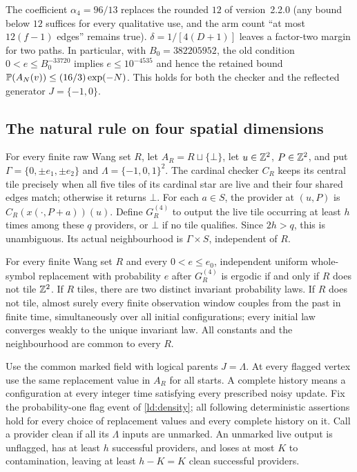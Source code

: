 The coefficient $\alpha_4=96/13$ replaces the rounded $12$ of version~2.2.0 (any bound below $12$
suffices for every qualitative use, and the arm count ``at most $12(f-1)$ edges'' remains true).
$\delta=1/[4(D+1)]$ leaves a factor-two margin for two paths. In particular, with $B_0=382205952$, the old condition $0<e\le B_0^{-33720}$ implies $e\le10^{-4535}$ and hence the retained bound $\mathbb{P}(A_N(v))\le(16/3)\exp(-N)$. This holds for both the checker and the reflected generator $J=\{-1,0\}$.

\subsection{The natural rule on four spatial dimensions}

For every finite raw Wang set $R$, let $A_R=R\sqcup\{\bot\}$, let $u\in\mathbb{Z}^2$, $P\in\mathbb{Z}^2$, and put $\Gamma=\{0,\pm e_1,\pm e_2\}$ and $\Lambda=\{-1,0,1\}^2$. The cardinal checker $C_R$ keeps its central tile precisely when all five tiles of its cardinal star are live and their four shared edges match; otherwise it returns $\bot$. For each $a\in S$, the provider at $(u,P)$ is $C_R(x(\cdot,P+a))(u)$. Define $G_R^{(4)}$ to output the live tile occurring at least $h$ times among these $q$ providers, or $\bot$ if no tile qualifies. Since $2h>q$, this is unambiguous. Its actual neighbourhood is $\Gamma\times S$, independent of $R$.

\begin{theorem}\label{ld:z4}
For every finite Wang set $R$ and every $0<e\le e_0$, independent uniform whole-symbol replacement with probability $e$ after $G_R^{(4)}$ is ergodic if and only if $R$ does not tile $\mathbb{Z}^2$. If $R$ tiles, there are two distinct invariant probability laws. If $R$ does not tile, almost surely every finite observation window couples from the past in finite time, simultaneously over all initial configurations; every initial law converges weakly to the unique invariant law. All constants and the neighbourhood are common to every $R$.
\end{theorem}

Use the common marked field with logical parents $J=\Lambda$. At every flagged vertex use the same replacement value in $A_R$ for all starts. A complete history means a configuration at every integer time satisfying every prescribed noisy update. Fix the probability-one flag event of \cref{ld:density}; all following deterministic assertions hold for every choice of replacement values and every complete history on it. Call a provider clean if all its $\Lambda$ inputs are unmarked. An unmarked live output is unflagged, has at least $h$ successful providers, and loses at most $K$ to contamination, leaving at least $h-K=K$ clean successful providers.

